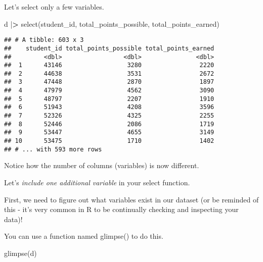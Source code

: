 \documentclass[
]{article}
\newenvironment{Shaded}{\begin{snugshade}}{\end{snugshade}}
\newcommand{\ErrorTok}[1]{\textcolor[rgb]{0.64,0.00,0.00}{\textbf{#1}}}
\newcommand{\FunctionTok}[1]{\textcolor[rgb]{0.00,0.00,0.00}{#1}}
\newcommand{\NormalTok}[1]{#1}
\newcommand{\SpecialCharTok}[1]{\textcolor[rgb]{0.00,0.00,0.00}{#1}}
\begin{document}
Let's select only a few variables.

\begin{Shaded}
\begin{Highlighting}[]
\NormalTok{d }\SpecialCharTok{|}\ErrorTok{\textgreater{}} 
  \FunctionTok{select}\NormalTok{(student\_id, total\_points\_possible, total\_points\_earned)}
\end{Highlighting}
\end{Shaded}

\begin{verbatim}
## # A tibble: 603 x 3
##    student_id total_points_possible total_points_earned
##         <dbl>                 <dbl>               <dbl>
##  1      43146                  3280                2220
##  2      44638                  3531                2672
##  3      47448                  2870                1897
##  4      47979                  4562                3090
##  5      48797                  2207                1910
##  6      51943                  4208                3596
##  7      52326                  4325                2255
##  8      52446                  2086                1719
##  9      53447                  4655                3149
## 10      53475                  1710                1402
## # ... with 593 more rows
\end{verbatim}

Notice how the number of columns (variables) is now different.

Let's \emph{include one additional variable} in your select function.

First, we need to figure out what variables exist in our dataset (or be
reminded of this - it's very common in R to be continually checking and
inspecting your data)!

You can use a function named glimpse() to do this.

\begin{Shaded}
\begin{Highlighting}[]
\FunctionTok{glimpse}\NormalTok{(d)}
\end{Highlighting}
\end{Shaded}
\end{document}
